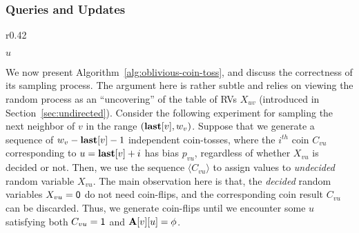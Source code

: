 \subsubsection{Queries and Updates}
\label{sec:nn-correctness}
\begin{wrapfigure}[14]{r}{0.42\textwidth}
\vspace{-1.5em}
\begin{framed}
    \renewcommand\figurename{Algorithm}
    \caption{Sampling }
    \label{alg:oblivious-coin-toss}
    \begin{algorithmic}[1]
            \State{$w_v \gets \min \{(P_v \cap (u, n]) \cup \{n+1\}\}$}
            \Repeat
            \EndIf
            \State \Return $u$
        \EndProcedure
    \end{algorithmic}
\end{framed}
\end{wrapfigure}
We now present Algorithm~\ref{alg:oblivious-coin-toss}, and discuss the correctness of its sampling process.
The argument here is rather subtle and relies on viewing the random process as an ``uncovering'' of the table of RVs $X_{uv}$
(introduced in Section~\ref{sec:undirected}).
Consider the following experiment for sampling the next neighbor of $v$ in the range $(\mathbf{last}[v],w_v)$.
Suppose that we generate a sequence of $w_v-\mathbf{last}[v]-1$ independent coin-tosses,
where the $i^{th}$ coin $C_{vu}$ corresponding to $u = \mathbf{last}[v]+i$ has bias $p_{vu}$, regardless of whether $X_{vu}$ is decided or not.
Then, we use the sequence $\langle C_{vu} \rangle$ to assign values to \emph{undecided} random variable $X_{vu}$.
The main observation here is that, the \emph{decided} random variables $X_{vu} = \mathsf{0}$ do not need coin-flips,
and the corresponding coin result $C_{vu}$ can be discarded.
Thus, we generate coin-flips until we encounter some $u$ satisfying both $C_{vu} = \mathsf{1}$ and $\mathbf{A}[v][u] = \phi$.

